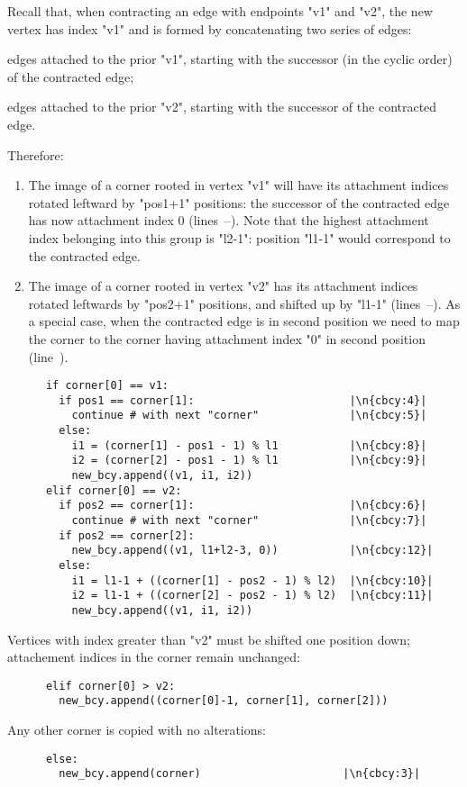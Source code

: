 Recall that, when contracting an edge with endpoints "v1" and "v2",
the new vertex has index "v1" and is formed by concatenating two
series of edges:
\begin{inparaenum}
\item edges attached to the prior "v1", starting with the successor
  (in the cyclic order) of the contracted edge;
\item edges attached to the prior "v2", starting with the successor
  of the contracted edge.
\end{inparaenum}
Therefore:
\begin{enumerate}
\item The image of a corner rooted in vertex "v1" will have its
  attachment indices rotated leftward by "pos1+1" positions: the
  successor of the contracted edge has now attachment index 0
  (lines~--).  Note that the highest attachment
  index belonging into this group is "l2-1": position "l1-1" would
  correspond to the contracted edge.
\item The image of a corner rooted in vertex "v2" has its attachment
  indices rotated leftwards by "pos2+1" positions, and shifted up by
  "l1-1" (lines~--).  As a special case, when
  the contracted edge is in second position we need to map the corner
  to the corner having attachment index "0" in second position
  (line~).
\end{enumerate}
\begin{lstlisting}
      if corner[0] == v1:
        if pos1 == corner[1]:                        |\n{cbcy:4}|
          continue # with next "corner"              |\n{cbcy:5}|
        else: 
          i1 = (corner[1] - pos1 - 1) % l1           |\n{cbcy:8}|
          i2 = (corner[2] - pos1 - 1) % l1           |\n{cbcy:9}|
          new_bcy.append((v1, i1, i2))
      elif corner[0] == v2:
        if pos2 == corner[1]:                        |\n{cbcy:6}|
          continue # with next "corner"              |\n{cbcy:7}|
        if pos2 == corner[2]:
          new_bcy.append((v1, l1+l2-3, 0))           |\n{cbcy:12}|
        else:
          i1 = l1-1 + ((corner[1] - pos2 - 1) % l2)  |\n{cbcy:10}|
          i2 = l1-1 + ((corner[2] - pos2 - 1) % l2)  |\n{cbcy:11}|
          new_bcy.append((v1, i1, i2))
\end{lstlisting}
Vertices with index greater than "v2" must be shifted one position
down; attachement indices in the corner remain unchanged:
\begin{lstlisting}
      elif corner[0] > v2:
        new_bcy.append((corner[0]-1, corner[1], corner[2]))
\end{lstlisting}
Any other corner is copied with no alterations:
\begin{lstlisting}
      else:
        new_bcy.append(corner)                      |\n{cbcy:3}|
\end{lstlisting}


